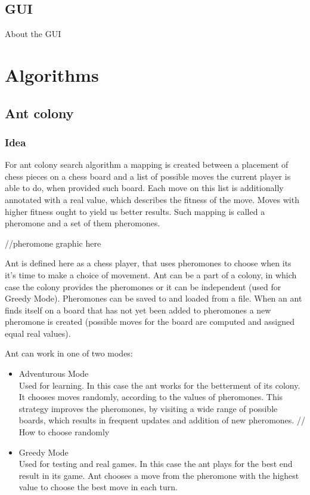 \documentclass[pdftex]{article}
\begin{document}
\subsection{GUI}
\label{sec:uci}

About the GUI

\section{Algorithms}
\label{sec:project}

\subsection{Ant colony}
\label{sec:ant}

\subsubsection{Idea}
For ant colony search algorithm a mapping is created between a placement of chess pieces on a chess board and a list of possible moves the current player is able to do, when provided such board. Each move on this list is additionally annotated with a real value, which describes the fitness of the move. Moves with higher fitness ought to yield us better results. Such mapping is called a pheromone and a set of them pheromones.

//pheromone graphic here

Ant is defined here as a chess player, that uses pheromones to choose when its it's time to make a choice of movement. Ant can be a part of a colony, in which case the colony provides the pheromones or it can be independent (used for Greedy Mode). Pheromones can be saved to and loaded from a file. When an ant finds itself on a board that has not yet been added to pheromones a new pheromone is created (possible moves for the board are computed and assigned equal real values).

 Ant can work in one of two modes: 
\begin{itemize}
 	\item Adventurous Mode \hfill \\
		Used for learning. In this case the ant works for the betterment of its colony. It chooses moves randomly, according to the values of pheromones. This strategy improves the pheromones, by visiting a wide range of possible boards, which results in frequent updates and addition of new pheromones.
		// How to choose randomly
	\item Greedy Mode \hfill \\
		Used for testing and real games. In this case the ant plays for the best end result in its game. Ant chooses a move from the pheromone with the highest value to choose the best move in each turn.
\end{itemize}
\end{document}
